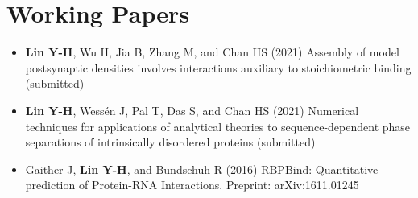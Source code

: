 \documentclass[11pt]{../yhlcv}
\def\tname#1{{\bf #1}}
\begin{document}
\section*{Working Papers}

\begin{itemize}[leftmargin=*]\itemsep-0.2pt


\item 
\tname{Lin Y-H}, Wu H, Jia B, Zhang M, and Chan HS (2021)
Assembly of model postsynaptic densities involves interactions auxiliary to stoichiometric binding (submitted)

\item
\tname{Lin Y-H}, Wessén J, Pal T, Das S, and Chan HS (2021)
Numerical techniques for applications of analytical theories to sequence-dependent phase separations of intrinsically disordered proteins (submitted)

\item 
Gaither J, \tname{Lin Y-H}, and Bundschuh R (2016) 
RBPBind: Quantitative prediction of Protein-RNA Interactions. 
Preprint: arXiv:1611.01245 %


\end{itemize} 
\end{document}
